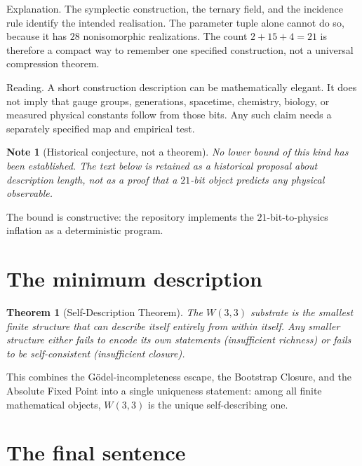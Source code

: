 \documentclass[11pt]{article}
\def\textbf#1{#1}%
\newtheorem*{theorem}{Theorem}
\newtheorem*{note}{Note}
\begin{document}
\textbf{Explanation.} The symplectic construction, the ternary field, and the incidence rule identify the intended realisation.  The parameter tuple alone cannot do so, because it has $28$ nonisomorphic realizations.  The count $2+15+4=21$ is therefore a compact way to remember one specified construction, not a universal compression theorem.

\medskip

\textbf{Reading.} A short construction description can be mathematically elegant.  It does not imply that gauge groups, generations, spacetime, chemistry, biology, or measured physical constants follow from those bits.  Any such claim needs a separately specified map and empirical test.

\begin{note}[Historical conjecture, not a theorem]
No lower bound of this kind has been established.  The text below is retained as a historical proposal about description length, not as a proof that a $21$-bit object predicts any physical observable.
\end{note}

The bound is constructive: the repository implements the $21$-bit-to-physics inflation as a deterministic program.

\section{The minimum description}

\begin{theorem}[Self-Description Theorem]
The $W(3,3)$ substrate is the smallest finite structure that can describe itself entirely from within itself. Any smaller structure either fails to encode its own statements (insufficient richness) or fails to be self-consistent (insufficient closure).
\end{theorem}

This combines the Gödel-incompleteness escape, the Bootstrap Closure, and the Absolute Fixed Point into a single uniqueness statement: among all finite mathematical objects, $W(3,3)$ is the unique self-describing one.

\section{The final sentence}
\end{document}
